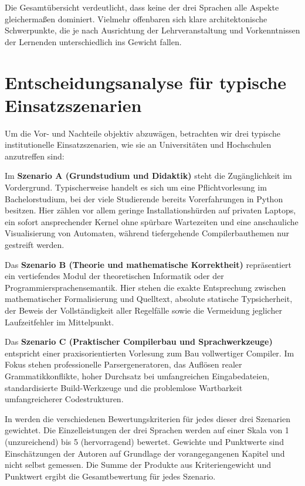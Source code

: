 Die Gesamtübersicht verdeutlicht, dass keine der drei Sprachen alle Aspekte gleichermaßen dominiert.
Vielmehr offenbaren sich klare architektonische Schwerpunkte, die je nach Ausrichtung der Lehrveranstaltung und Vorkenntnissen der Lernenden unterschiedlich ins Gewicht fallen.

\section{Entscheidungsanalyse für typische Einsatzszenarien}
\label{sec:recommendation_mcda}

Um die Vor- und Nachteile objektiv abzuwägen, betrachten wir drei typische institutionelle Einsatzszenarien, wie sie an Universitäten und Hochschulen anzutreffen sind:

Im \textbf{Szenario A (Grundstudium und Didaktik)} steht die Zugänglichkeit im Vordergrund.
Typischerweise handelt es sich um eine Pflichtvorlesung im Bachelorstudium, bei der viele Studierende bereits Vorerfahrungen in Python besitzen.
Hier zählen vor allem geringe Installationshürden auf privaten Laptops, ein sofort ansprechender Kernel ohne spürbare Wartezeiten und eine anschauliche Visualisierung von Automaten, während tiefergehende Compilerbauthemen nur gestreift werden.

Das \textbf{Szenario B (Theorie und mathematische Korrektheit)} repräsentiert ein vertiefendes Modul der theoretischen Informatik oder der Programmiersprachensemantik.
Hier stehen die exakte Entsprechung zwischen mathematischer Formalisierung und Quelltext, absolute statische Typsicherheit, der Beweis der Vollständigkeit aller Regelfälle sowie die Vermeidung jeglicher Laufzeitfehler im Mittelpunkt.

Das \textbf{Szenario C (Praktischer Compilerbau und Sprachwerkzeuge)} entspricht einer praxisorientierten Vorlesung zum Bau vollwertiger Compiler.
Im Fokus stehen professionelle Parsergeneratoren, das Auflösen realer Grammatikkonflikte, hoher Durchsatz bei umfangreichen Eingabedateien, standardisierte Build-Werkzeuge und die problemlose Wartbarkeit umfangreicherer Codestrukturen.

In  werden die verschiedenen Bewertungskriterien für jedes dieser drei Szenarien gewichtet.
Die Einzelleistungen der drei Sprachen werden auf einer Skala von 1 (unzureichend) bis 5 (hervorragend) bewertet.
Gewichte und Punktwerte sind Einschätzungen der Autoren auf Grundlage der vorangegangenen Kapitel und nicht selbst gemessen.
Die Summe der Produkte aus Kriteriengewicht und Punktwert ergibt die Gesamtbewertung für jedes Szenario.

